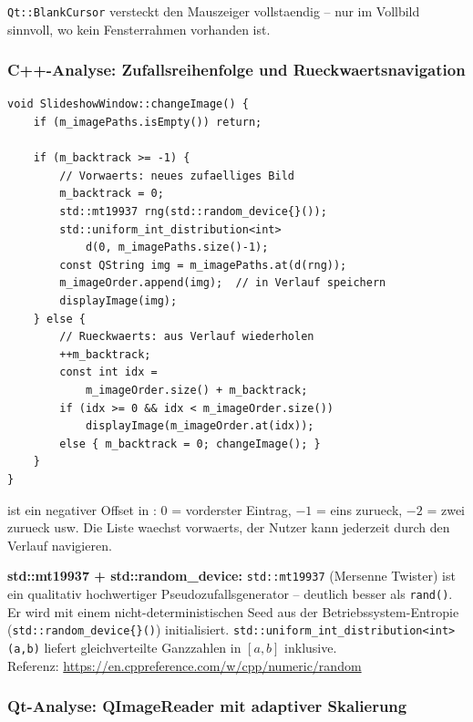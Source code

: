 \verb|Qt::BlankCursor| versteckt den Mauszeiger vollstaendig --
nur im Vollbild sinnvoll, wo kein Fensterrahmen vorhanden ist.

\subsubsection{C++-Analyse: Zufallsreihenfolge und Rueckwaertsnavigation}

\begin{lstlisting}[caption={changeImage: Verlaufslogik mit m\_backtrack}]
void SlideshowWindow::changeImage() {
    if (m_imagePaths.isEmpty()) return;

    if (m_backtrack >= -1) {
        // Vorwaerts: neues zufaelliges Bild
        m_backtrack = 0;
        std::mt19937 rng(std::random_device{}());
        std::uniform_int_distribution<int>
            d(0, m_imagePaths.size()-1);
        const QString img = m_imagePaths.at(d(rng));
        m_imageOrder.append(img);  // in Verlauf speichern
        displayImage(img);
    } else {
        // Rueckwaerts: aus Verlauf wiederholen
        ++m_backtrack;
        const int idx =
            m_imageOrder.size() + m_backtrack;
        if (idx >= 0 && idx < m_imageOrder.size())
            displayImage(m_imageOrder.at(idx));
        else { m_backtrack = 0; changeImage(); }
    }
}
\end{lstlisting}

 ist ein negativer Offset in
: 0 = vorderster Eintrag,
$-1$ = eins zurueck, $-2$ = zwei zurueck usw.
Die Liste waechst vorwaerts, der Nutzer kann jederzeit
durch den Verlauf navigieren.

\begin{hinweis}
\textbf{std::mt19937 + std::random\_device:}
\verb|std::mt19937| (Mersenne Twister) ist ein
qualitativ hochwertiger Pseudozufallsgenerator --
deutlich besser als \verb|rand()|. Er wird mit einem
nicht-deterministischen Seed aus der Betriebssystem-Entropie
(\verb|std::random_device{}()|) initialisiert.
\verb|std::uniform_int_distribution<int>(a,b)| liefert
gleichverteilte Ganzzahlen in $[a, b]$ inklusive.\\
Referenz: \url{https://en.cppreference.com/w/cpp/numeric/random}
\end{hinweis}

\subsubsection{Qt-Analyse: QImageReader mit adaptiver Skalierung}

